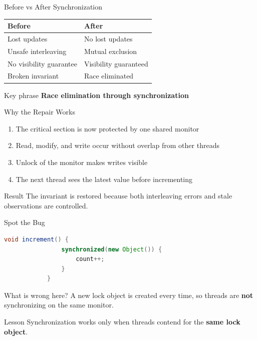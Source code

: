 \documentclass[aspectratio=169,11pt]{beamer}
\begin{document}
	\begin{frame}{Before vs After Synchronization}
		\centering
		\begin{tabular}{@{}ll@{}}
			\toprule
			\textbf{Before} & \textbf{After} \\
			\midrule
			Lost updates & No lost updates \\
			Unsafe interleaving & Mutual exclusion \\
			No visibility guarantee & Visibility guaranteed \\
			Broken invariant & Race eliminated \\
			\bottomrule
		\end{tabular}
		
		\bigskip
		
		\begin{alertblock}{Key phrase}
			\textbf{Race elimination through synchronization}
		\end{alertblock}
	\end{frame}
	
	\begin{frame}{Why the Repair Works}
		\begin{enumerate}
			\item The critical section is now protected by one shared monitor
			\item Read, modify, and write occur without overlap from other threads
			\item Unlock of the monitor makes writes visible
			\item The next thread sees the latest value before incrementing
		\end{enumerate}
		
		\bigskip
		
		\begin{block}{Result}
			The invariant is restored because both interleaving errors and stale observations are controlled.
		\end{block}
	\end{frame}
	
	\begin{frame}[fragile]{Spot the Bug}
		\begin{lstlisting}[language=Java]
			void increment() {
				synchronized(new Object()) {
					count++;
				}
			}
		\end{lstlisting}
		
		\vspace{0.3cm}
		
		\begin{alertblock}{What is wrong here?}
			A new lock object is created every time, so threads are \textbf{not} synchronizing on the same monitor.
		\end{alertblock}
		
		\begin{block}{Lesson}
			Synchronization works only when threads contend for the \textbf{same lock object}.
		\end{block}
	\end{frame}
	
\end{document}

